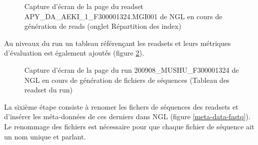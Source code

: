 \begin{figure}[H]
    \centering
    \caption{\footnotesize{Capture d'écran de la page du readset APY\_DA\_AEKI\_1\_F300001324.MGI001 de NGL en cours de génération de reads (onglet \og Répartition des index\fg{})}}
    \label{NGL-screenshot_readset-index}
\end{figure}

Au niveaux du run un tableau référençant les readsets et leurs métriques d'évaluation est également ajoutés (figure \ref{NGL-screenshot_tab-run-readset}).

\begin{figure}[H]
    \centering
    \caption{\footnotesize{Capture d'écran de la page du run 200908\_MUSHU\_F300001324 de NGL en cours de génération de fichiers de séquences (Tableau des readset du run)}}
    \label{NGL-screenshot_tab-run-readset}
\end{figure}

La sixième étape consiste à renomer les fichers de séquences des readsets et d'insérer les méta-données de ces derniers dans NGL (figure \ref{meta-data-fastq}).
Le renommage des fichiers est nécessaire pour que chaque fichier de séquence ait un nom unique et \og parlant\fg{}.\\

